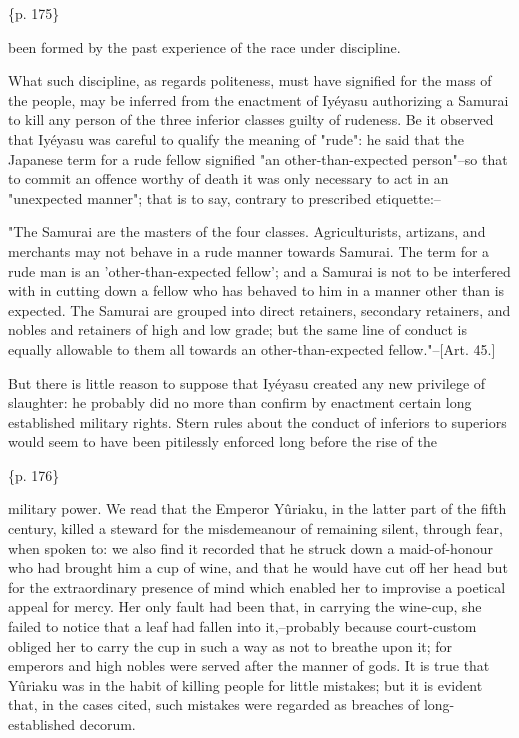 \{p. 175\}

been formed by the past experience of the race under discipline.

What such discipline, as regards politeness, must have signified for the mass of the people, may be inferred from the enactment of Iyéyasu authorizing a Samurai to kill any person of the three inferior classes guilty of rudeness. Be it observed that Iyéyasu was careful to qualify the meaning of "rude": he said that the Japanese term for a rude fellow signified "an other-than-expected person"--so that to commit an offence worthy of death it was only necessary to act in an "unexpected manner"; that is to say, contrary to prescribed etiquette:--

"The Samurai are the masters of the four classes. Agriculturists, artizans, and merchants may not behave in a rude manner towards Samurai. The term for a rude man is an 'other-than-expected fellow'; and a Samurai is not to be interfered with in cutting down a fellow who has behaved to him in a manner other than is expected. The Samurai are grouped into direct retainers, secondary retainers, and nobles and retainers of high and low grade; but the same line of conduct is equally allowable to them all towards an other-than-expected fellow."--[Art. 45.]

But there is little reason to suppose that Iyéyasu created any new privilege of slaughter: he probably did no more than confirm by enactment certain long established military rights. Stern rules about the conduct of inferiors to superiors would seem to have been pitilessly enforced long before the rise of the

\{p. 176\}

military power. We read that the Emperor Yûriaku, in the latter part of the fifth century, killed a steward for the misdemeanour of remaining silent, through fear, when spoken to: we also find it recorded that he struck down a maid-of-honour who had brought him a cup of wine, and that he would have cut off her head but for the extraordinary presence of mind which enabled her to improvise a poetical appeal for mercy. Her only fault had been that, in carrying the wine-cup, she failed to notice that a leaf had fallen into it,--probably because court-custom obliged her to carry the cup in such a way as not to breathe upon it; for emperors and high nobles were served after the manner of gods. It is true that Yûriaku was in the habit of killing people for little mistakes; but it is evident that, in the cases cited, such mistakes were regarded as breaches of long-established decorum.



